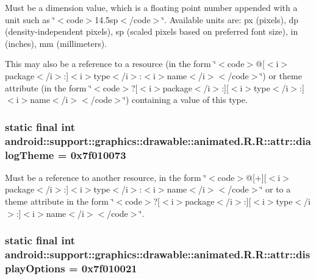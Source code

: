 Must be a dimension value, which is a floating point number appended with a unit such as \char`\"{}$<$code$>$14.5sp$<$/code$>$\char`\"{}. Available units are: px (pixels), dp (density-independent pixels), sp (scaled pixels based on preferred font size), in (inches), mm (millimeters). 

This may also be a reference to a resource (in the form \char`\"{}$<$code$>$@\mbox{[}$<$i$>$package$<$/i$>$:\mbox{]}$<$i$>$type$<$/i$>$:$<$i$>$name$<$/i$>$$<$/code$>$\char`\"{}) or theme attribute (in the form \char`\"{}$<$code$>$?\mbox{[}$<$i$>$package$<$/i$>$:\mbox{]}\mbox{[}$<$i$>$type$<$/i$>$:\mbox{]}$<$i$>$name$<$/i$>$$<$/code$>$\char`\"{}) containing a value of this type. \hypertarget{classandroid_1_1support_1_1graphics_1_1drawable_1_1animated_1_1_r_1_1attr_75b59b0b7f75587a1249fa9a1332bf79}{
\subsubsection[{dialogTheme}]{\setlength{\rightskip}{0pt plus 5cm}static final int android::support::graphics::drawable::animated.R.R::attr::dialogTheme = 0x7f010073}}
\label{classandroid_1_1support_1_1graphics_1_1drawable_1_1animated_1_1_r_1_1attr_75b59b0b7f75587a1249fa9a1332bf79}


Must be a reference to another resource, in the form \char`\"{}$<$code$>$@\mbox{[}+\mbox{]}\mbox{[}$<$i$>$package$<$/i$>$:\mbox{]}$<$i$>$type$<$/i$>$:$<$i$>$name$<$/i$>$$<$/code$>$\char`\"{} or to a theme attribute in the form \char`\"{}$<$code$>$?\mbox{[}$<$i$>$package$<$/i$>$:\mbox{]}\mbox{[}$<$i$>$type$<$/i$>$:\mbox{]}$<$i$>$name$<$/i$>$$<$/code$>$\char`\"{}. \hypertarget{classandroid_1_1support_1_1graphics_1_1drawable_1_1animated_1_1_r_1_1attr_51dabf0e05f64aa277ecb4ab2289840d}{
\subsubsection[{displayOptions}]{\setlength{\rightskip}{0pt plus 5cm}static final int android::support::graphics::drawable::animated.R.R::attr::displayOptions = 0x7f010021}}
\label{classandroid_1_1support_1_1graphics_1_1drawable_1_1animated_1_1_r_1_1attr_51dabf0e05f64aa277ecb4ab2289840d}


